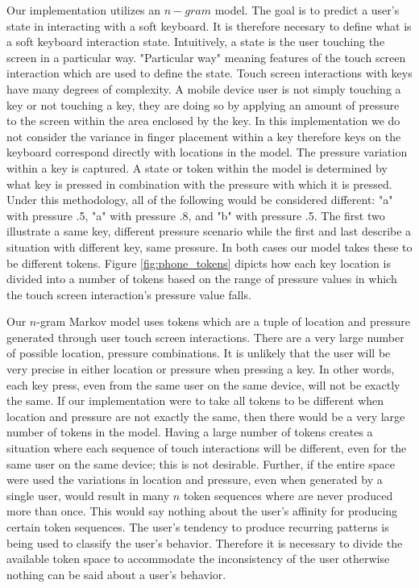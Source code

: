 Our implementation utilizes an $n-gram$ model.
The goal is to predict a user's state in
interacting with a soft keyboard.
%
It is therefore necesary
to define what is a 
soft keyboard interaction state.
%
Intuitively, a state is the user touching the screen in a particular way.
"Particular way" meaning features of the touch screen interaction
which are used to define the state.
%
Touch screen interactions with keys have
many degrees of complexity.
A mobile device user is not simply
touching a key or not touching a key,
they are doing so by applying an amount of pressure to the screen
within the area enclosed by the key.
%
In this implementation we do not consider the variance 
in finger placement within a key
therefore keys on the keyboard correspond directly with locations in the model.
The pressure variation within a key is captured.
%
A state or token within the model is
determined by what key is pressed in combination with
the pressure with which it is pressed.
%
Under this methodology,
all of the following would be considered different:
"a" with pressure .5,
"a" with pressure .8, and
"b" with pressure .5.
The first two illustrate a same key, different pressure scenario
while the first and last describe
a situation with different key, same pressure.
In both cases our model takes these to be 
different tokens.
%
Figure \ref{fig:phone_tokens}
dipicts how each key location is
divided into a number of tokens based on
the range of pressure values in which
the touch screen interaction's pressure value falls.


Our $n$-gram Markov model uses tokens
which are a tuple of location and pressure
generated through user touch screen interactions. 
There are a very large number of possible
location, pressure combinations.
%
It is unlikely that the user will be
very precise in either location or pressure
when pressing a key.
In other words,
each key press, 
even from the same user on the same device,
will not be exactly the same.
%
If our implementation were to take all tokens to be different when
location and pressure are not exactly the same,
then there would be a very large number of tokens in the model.
%
Having a large number of tokens
creates a situation where each sequence of 
touch interactions will be different,
even for the same user on the same device;
this is not desirable.
%
Further, if the entire space were used 
the variations in location and pressure,
even when generated by a single user,
would result in many $n$ token sequences
where are never produced more than once.
%
This would say nothing about
the user's affinity for producing certain token sequences.
The user's tendency to produce recurring patterns
is being used to classify the user's behavior.
%
Therefore it is necessary to divide the available token space
to accommodate the inconsistency of the user
otherwise
nothing can be said about a user's behavior.

